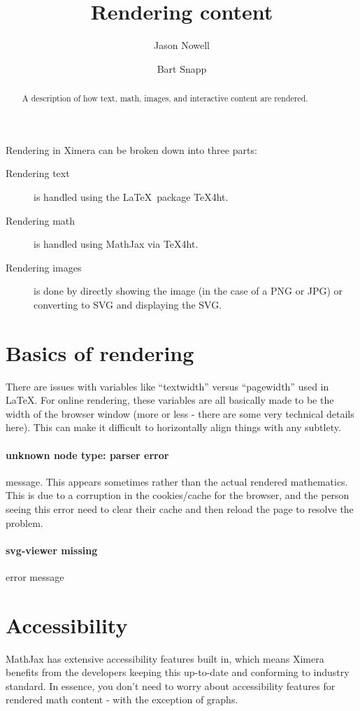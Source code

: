 \documentclass{ximera}
\title{Rendering content}
\author{Jason Nowell \and Bart Snapp}
\begin{document}
\begin{abstract}
    A description of how text, math, images, and interactive content are
    rendered.
\end{abstract}
\maketitle

Rendering in Ximera can be broken down into three parts:
\begin{description}
    \item[Rendering text] is handled using the \LaTeX\ package TeX4ht.
    \item[Rendering math] is handled using MathJax via TeX4ht.
    \item[Rendering images] is done by directly showing the image (in the case
        of a PNG or JPG) or converting to SVG and displaying the SVG.
\end{description}

\section{Basics of rendering}

There are issues with variables like ``textwidth'' versus
``pagewidth'' used in LaTeX. For online rendering, these variables are all
basically made to be the width of the browser window (more or less - there are
some very technical details here). This can make it difficult to horizontally
align things with any subtlety.


\paragraph{unknown node type: parser error} message. This appears
          sometimes rather than the actual rendered mathematics. This is due to a
          corruption in the cookies/cache for the browser, and the person seeing this
          error need to clear their cache and then reload the page to resolve the
          problem.



\paragraph{svg-viewer missing} error message




\section{Accessibility}
MathJax has extensive accessibility features built in, which means
Ximera benefits from the developers keeping this up-to-date and conforming to
industry standard. In essence, you don't need to worry about accessibility
features for rendered math content - with the exception of graphs.
\end{document}
